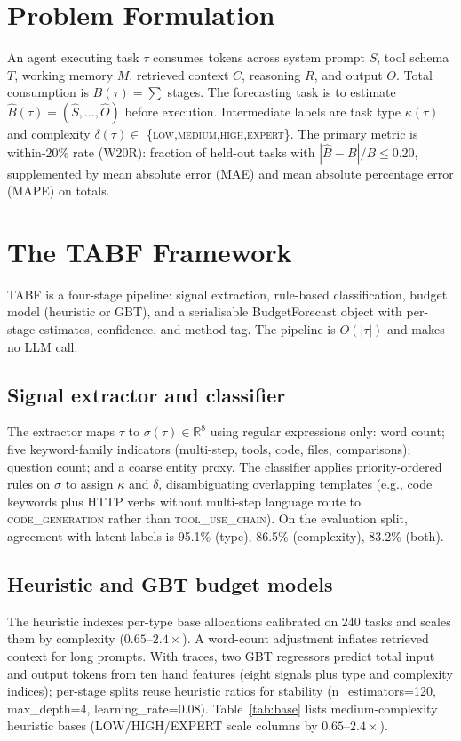 \documentclass[journal]{IEEEtran}
\newcommand{\code}[1]{{\small #1}}
\begin{document}
\section{Problem Formulation}
\label{sec:problem}

An agent executing task $\tau$ consumes tokens across system prompt $S$, tool
schema $T$, working memory $M$, retrieved context $C$, reasoning $R$, and output
$O$. Total consumption is $B(\tau)=\sum$ stages. The forecasting task is to
estimate $\hat{B}(\tau)=(\hat{S},\ldots,\hat{O})$ before execution. Intermediate
labels are task type $\kappa(\tau)$ and complexity $\delta(\tau)\in$
\{\textsc{low},\textsc{medium},\textsc{high},\textsc{expert}\}. The primary
metric is within-20\% rate (W20R): fraction of held-out tasks with
$|\hat{B}-B|/B\le 0.20$, supplemented by mean absolute error (MAE) and mean
absolute percentage error (MAPE) on totals.

\section{The TABF Framework}
\label{sec:framework}

TABF is a four-stage pipeline: signal extraction, rule-based classification,
budget model (heuristic or GBT), and a serialisable \code{BudgetForecast}
object with per-stage estimates, confidence, and method tag. The pipeline is
$O(|\tau|)$ and makes no LLM call.

\subsection{Signal extractor and classifier}
The extractor maps $\tau$ to $\sigma(\tau)\in\mathbb{R}^8$ using regular
expressions only: word count; five keyword-family indicators (multi-step,
tools, code, files, comparisons); question count; and a coarse entity proxy.
The classifier applies priority-ordered rules on $\sigma$ to assign $\kappa$ and
$\delta$, disambiguating overlapping templates (e.g., code keywords plus HTTP
verbs without multi-step language route to \textsc{code\_generation} rather than
\textsc{tool\_use\_chain}). On the evaluation split, agreement with latent
labels is 95.1\% (type), 86.5\% (complexity), 83.2\% (both).

\subsection{Heuristic and GBT budget models}
The heuristic indexes per-type base allocations calibrated on 240 tasks and
scales them by complexity ($0.65$--$2.4\times$). A word-count adjustment inflates
retrieved context for long prompts. With traces, two GBT regressors predict total
input and output tokens from ten hand features (eight signals plus type and
complexity indices); per-stage splits reuse heuristic ratios for stability
(\code{n\_estimators=120}, \code{max\_depth=4}, \code{learning\_rate=0.08}).
Table~\ref{tab:base} lists medium-complexity heuristic bases (LOW/HIGH/EXPERT
scale columns by $0.65$--$2.4\times$).
\end{document}
